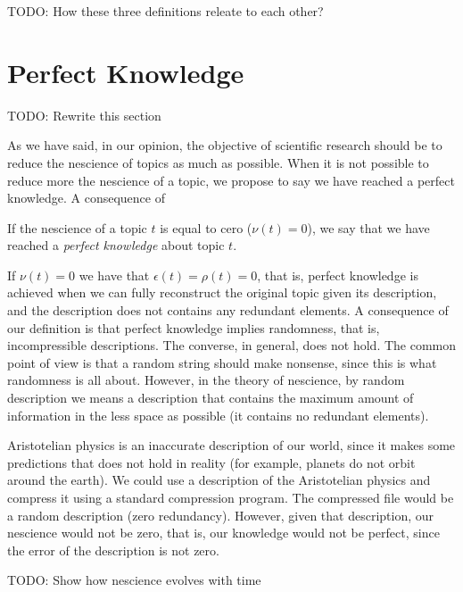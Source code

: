 {\color{red} TODO: How these three definitions releate to each other?}


%
%

\section{Perfect Knowledge}

{\color{red} TODO: Rewrite this section}

As we have said, in our opinion, the objective of scientific research should be to reduce the nescience of topics as much as possible. When it is not possible to reduce more the nescience of a topic, we propose to say we have reached a perfect knowledge. A consequence of 

\begin{definition}
If the nescience of a topic $t$ is equal to cero ($\nu(t)=0$), we say that we have reached a \emph{perfect knowledge} about topic $t$.
\end{definition}

If $\nu(t)=0$ we have that $\epsilon(t) = \rho(t) = 0$, that is, perfect knowledge is achieved when we can fully reconstruct the original topic given its description, and the description does not contains any redundant elements. A consequence of our definition is that perfect knowledge implies randomness, that is, incompressible descriptions. The converse, in general, does not hold. The common point of view is that a random string should make nonsense, since this is what randomness is all about. However, in the theory of nescience, by random description we means a description that contains the maximum amount of information in the less space as possible (it contains no redundant elements).

\begin{example}
Aristotelian physics is an inaccurate description of our world, since it makes some predictions that does not hold in reality (for example, planets do not orbit around the earth). We could use a description of the Aristotelian physics and compress it using a standard compression program. The compressed file would be a random description (zero redundancy). However, given that description, our nescience would not be zero, that is, our knowledge would not be perfect, since the error of the description is not zero.
\end{example}

{\color{red} TODO: Show how nescience evolves with time}

